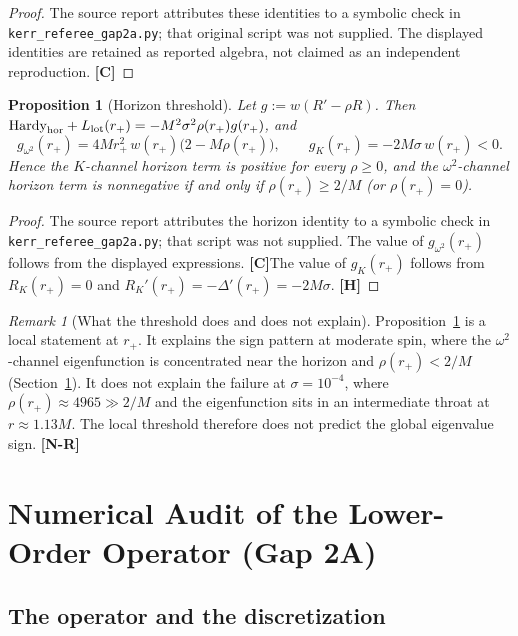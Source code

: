 \documentclass[11pt,a4paper]{article}
\newcommand{\VN}{\textcolor{vn}{\textbf{[N-R]}}}
\newcommand{\VH}{\textcolor{vh}{\textbf{[H]}}}
\newcommand{\CC}{\textcolor{cc}{\textbf{[C]}}}
\newtheorem{proposition}[theorem]{Proposition}
\theoremstyle{remark}
\newtheorem{remark}[theorem]{Remark}
\theoremstyle{definition}
\begin{document}
\begin{proof}
The source report attributes these identities to a symbolic check in \texttt{kerr\_referee\_gap2a.py}; that original script was not supplied. The displayed identities are retained as reported algebra, not claimed as an independent reproduction. \CC
\end{proof}

\begin{proposition}[Horizon threshold]
\label{prop:horizon}
Let $g := w(R' - \rho R)$. Then $\mathrm{Hardy}_{\rm hor} + L_{\rm lot}(r_+) = -M^2\sigma^2\rho(r_+)g(r_+)$, and
\[
g_{\omega^2}(r_+) = 4Mr_+^2\,w(r_+)\bigl(2 - M\rho(r_+)\bigr), \qquad g_K(r_+) = -2M\sigma\,w(r_+) < 0.
\]
Hence the $K$-channel horizon term is positive for every $\rho\ge0$, and the $\omega^2$-channel horizon term is nonnegative if and only if $\rho(r_+) \ge 2/M$ (or $\rho(r_+) = 0$).
\end{proposition}

\begin{proof}
The source report attributes the horizon identity to a symbolic check in \texttt{kerr\_referee\_gap2a.py}; that script was not supplied. The value of $g_{\omega^2}(r_+)$ follows from the displayed expressions. \CC The value of $g_K(r_+)$ follows from $R_K(r_+) = 0$ and $R_K'(r_+) = -\Delta'(r_+) = -2M\sigma$. \VH
\end{proof}

\begin{remark}[What the threshold does and does not explain]
Proposition~\ref{prop:horizon} is a local statement at $r_+$. It explains the sign pattern at moderate spin, where the $\omega^2$-channel eigenfunction is concentrated near the horizon and $\rho(r_+) < 2/M$ (Section~\ref{sec:gap2a}). It does not explain the failure at $\sigma = 10^{-4}$, where $\rho(r_+) \approx 4965 \gg 2/M$ and the eigenfunction sits in an intermediate throat at $r \approx 1.13M$. The local threshold therefore does not predict the global eigenvalue sign. \VN
\end{remark}

\section{Numerical Audit of the Lower-Order Operator (Gap 2A)}
\label{sec:gap2a}

\subsection{The operator and the discretization}
\end{document}
